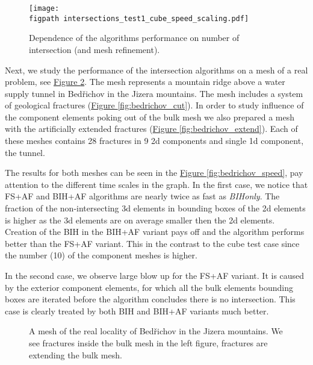 \documentclass{elsarticle}
\newcommand{\fig}[1]{\hyperref[#1]{Figure \ref{#1}}}
\newcommand{\figpath}{figures/}
\begin{document}
\begin{figure}[!htb]
    \centering
    \texttt{[image: \\figpath intersections\_test1\_cube\_speed\_scaling.pdf]}
    \caption{Dependence of the algorithms performance on number of intersection (and mesh refinement). }
    \label{fig:cube_speed}
\end{figure}



Next, we study the performance of the intersection algorithms on a mesh of a real problem, see \fig{fig:bedrichov_meshes}.
The mesh represents a mountain ridge above a water supply tunnel in Bed{\v r}ichov in the Jizera mountains.
The mesh includes a system of geological fractures (\fig{fig:bedrichov_cut}). In order to study influence of the component elements poking out of
the bulk mesh we also prepared a mesh with the artificially extended fractures (\fig{fig:bedrichov_extend}). 
Each of these meshes contains 28 fractures in 9 2d components and single 1d component, the tunnel.

The results for both meshes can be seen in the \fig{fig:bedrichov_speed}, pay attention to the different time
scales in the graph. In the first case, we notice that FS+AF and BIH+AF algorithms are nearly twice as fast as \emph{BIHonly}.
The fraction of the non-intersecting 3d elements in bounding boxes of the 2d elements is higher as the 3d elements are on average smaller then the 2d elements.
Creation of the BIH in the BIH+AF variant pays off and the algorithm performs better than the FS+AF variant.
This in the contrast to the cube test case since the number (10) of the component meshes is higher.

In the second case, we observe large blow up for the FS+AF variant. It is caused by the exterior component elements, 
for which all the bulk elements bounding boxes are iterated before the algorithm concludes there is no intersection.
This case is clearly treated by both BIH and BIH+AF variants much better.



\begin{figure}[!htb]
    \hspace{3pt}
    \caption{A mesh of the real locality of Bed{\v r}ichov in the Jizera mountains.
             We see fractures inside the bulk mesh in the left figure,
             fractures are extending the bulk mesh.}
    \label{fig:bedrichov_meshes}
\end{figure}
\end{document}
